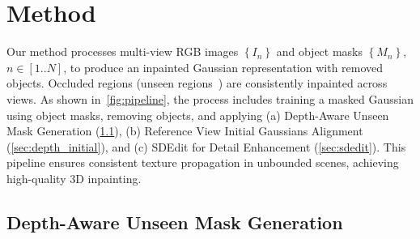 \section{Method}
\label{sec:method}


Our method processes multi-view RGB images $\left\{ I_n \right\}$ and object masks $\left\{ M_n \right\}$, $n \in \left[1..N \right]$, to produce an inpainted Gaussian representation with removed objects. Occluded regions (unseen regions~\cite{ye2023gaussian}) are consistently inpainted across views. As shown in~\cref{fig:pipeline}, the process includes training a masked Gaussian using object masks, removing objects, and applying (a) Depth-Aware Unseen Mask Generation (\cref{sec:unseen}), (b) Reference View Initial Gaussians Alignment
(\cref{sec:depth_initial}), and (c) SDEdit for Detail Enhancement (\cref{sec:sdedit}). This pipeline ensures consistent texture propagation in unbounded scenes, achieving high-quality 3D inpainting.







\subsection{Depth-Aware Unseen Mask Generation} \label{sec:unseen}

